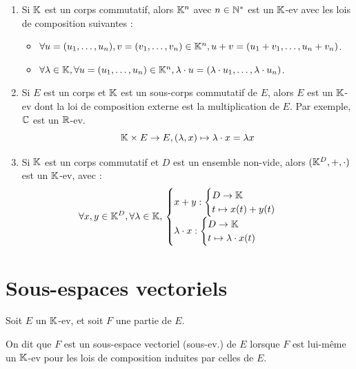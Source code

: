 \documentclass[12pt, a4paper]{report}
\begin{document}
\begin{example}
    \begin{enumerate}
        \item Si $\mathbb{K}$ est un corps commutatif, alors $\mathbb{K}^n$ avec $n\in \mathbb{N}^*$ est un $\mathbb{K}$-ev avec les lois de composition suivantes :
        \begin{itemize}
            \item $\forall u=(u_1,\dots,u_n), v=(v_1,\dots,v_n) \in \mathbb{K}^n, u+v = (u_1 + v_1, \dots, u_n + v_n)$.
            \item $\forall \lambda \in \mathbb{K}, \forall u=(u_1,\dots,u_n) \in \mathbb{K}^n, \lambda\cdot u = (\lambda\cdot u_1, \dots, \lambda\cdot u_n)$.
        \end{itemize}
        \item Si $E$ est un corps et $\mathbb{K}$ est un sous-corps commutatif de $E$, alors $E$ est un $\mathbb{K}$-ev dont la loi de composition externe est la multiplication de $E$. Par exemple, $\mathbb{C}$ est un $\mathbb{R}$-ev.
        $$\mathbb{K}\times E \to E, (\lambda, x) \mapsto \lambda\cdot x = \lambda x$$
        \item Si $\mathbb{K}$ est un corps commutatif et $D$ est un ensemble non-vide, alors $(\mathbb{K}^D, +, \cdot)$ est un $\mathbb{K}$-ev, avec :
        $$\forall x,y \in \mathbb{K}^D, \forall \lambda \in \mathbb{K},\\
        \begin{cases}
        x+y:\begin{cases}
        D\to\mathbb{K}\\
        t\mapsto x(t)+y(t)
        \end{cases}\\
        \lambda\cdot x:\begin{cases}
        D\to\mathbb{K}\\
        t\mapsto \lambda\cdot x(t)
        \end{cases}
        \end{cases}$$
    \end{enumerate}
\end{example}

\chapter{Sous-espaces vectoriels}

\begin{definition}
    Soit $E$ un $\mathbb{K}$-ev, et soit $F$ une partie de $E$.

    On dit que $F$ est un sous-espace vectoriel (sous-ev.) de $E$ lorsque $F$ est lui-même un $\mathbb{K}$-ev pour les lois de composition induites par celles de $E$.
\end{definition}
\end{document}

